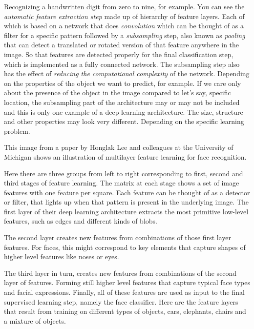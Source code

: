 \begin{multicols}{2}
Recognizing a handwritten digit from zero to nine, for example. You can see the \emph{automatic feature extraction step} made up of hierarchy of feature layers. Each of which is based on a network that does \emph{convolution} which can be thought of as a filter for a specific pattern followed by a \emph{subsampling} step, also known as \emph{pooling} that can detect a translated or rotated version of that feature anywhere in the image. So that features are detected properly for the final classification step, which is implemented as a fully connected network. The subsampling step also has the effect of \emph{reducing the computational complexity} of the network. Depending on the properties of the object we want to predict, for example. If we care only about the presence of the object in the image compared to let's say, specific location, the subsampling part of the architecture may or may not be included and this is only one example of a deep learning architecture. The size, structure and other properties may look very different. Depending on the specific learning problem. 

This image from a paper by Honglak Lee and colleagues at the University of Michigan shows an illustration of multilayer feature learning for face recognition. 

Here there are three groups from left to right corresponding to first, second and third stages of feature learning. The matrix at each stage shows a set of image features with one feature per square. Each feature can be thought of as a detector or filter, that lights up when that pattern is present in the underlying image. The first layer of their deep learning architecture extracts the most primitive low-level features, such as edges and different kinds of blobs. 

The second layer creates new features from combinations of those first layer features. For faces, this might correspond to key elements that capture shapes of higher level features like noses or eyes. 

The third layer in turn, creates new features from combinations of the second layer of features. Forming still higher level features that capture typical face types and facial expressions. Finally, all of these features are used as input to the final supervised learning step, namely the face classifier. Here are the feature layers that result from training on different types of objects, cars, elephants, chairs and a mixture of objects. 


\end{multicols}
